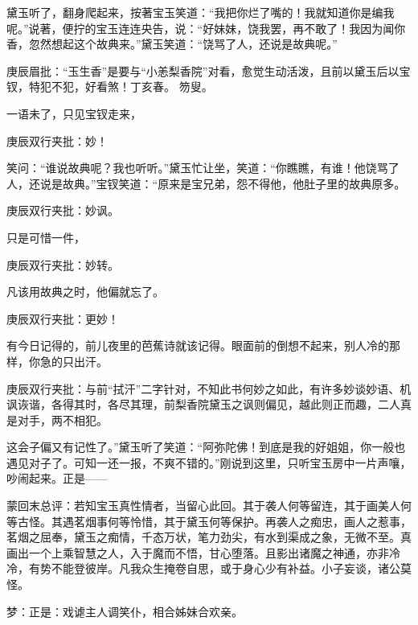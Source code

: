 \begin{parag}


    黛玉听了，翻身爬起来，按著宝玉笑道：“我把你烂了嘴的！我就知道你是编我呢。”说著，便拧的宝玉连连央告，说：“好妹妹，饶我罢，再不敢了！我因为闻你香，忽然想起这个故典来。”黛玉笑道：“饶骂了人，还说是故典呢。”\begin{note}庚辰眉批：“玉生香”是要与“小恙梨香院”对看，愈觉生动活泼，且前以黛玉后以宝钗，特犯不犯，好看煞！丁亥春。 笏叟。\end{note}
\end{parag}


\begin{parag}


    一语未了，只见宝钗走来，\begin{note}庚辰双行夹批：妙！\end{note}笑问：“谁说故典呢？我也听听。”黛玉忙让坐，笑道：“你瞧瞧，有谁！他饶骂了人，还说是故典。”宝钗笑道：“原来是宝兄弟，怨不得他，他肚子里的故典原多。\begin{note}庚辰双行夹批：妙讽。\end{note}只是可惜一件，\begin{note}庚辰双行夹批：妙转。\end{note}凡该用故典之时，他偏就忘了。\begin{note}庚辰双行夹批：更妙！\end{note}有今日记得的，前儿夜里的芭蕉诗就该记得。眼面前的倒想不起来，别人冷的那样，你急的只出汗。\begin{note}庚辰双行夹批：与前“拭汗”二字针对，不知此书何妙之如此，有许多妙谈妙语、机讽诙谐，各得其时，各尽其理，前梨香院黛玉之讽则偏见，越此则正而趣，二人真是对手，两不相犯。\end{note}这会子偏又有记性了。”黛玉听了笑道：“阿弥陀佛！到底是我的好姐姐，你一般也遇见对子了。可知一还一报，不爽不错的。”刚说到这里，只听宝玉房中一片声嚷，吵闹起来。正是——
\end{parag}

\begin{parag}

    \begin{note}蒙回末总评：若知宝玉真性情者，当留心此回。其于袭人何等留连，其于画美人何等古怪。其遇茗烟事何等怜惜，其于黛玉何等保护。再袭人之痴忠，画人之惹事，茗烟之屈奉，黛玉之痴情，千态万状，笔力劲尖，有水到渠成之象，无微不至。真画出一个上乘智慧之人，入于魔而不悟，甘心堕落。且影出诸魔之神通，亦非冷冷，有势不能登彼岸。凡我众生掩卷自思，或于身心少有补益。小子妄谈，诸公莫怪。\end{note}
\end{parag}


\begin{parag}


    \begin{note}梦：正是：戏谑主人调笑仆，相合姊妹合欢亲。\end{note}
\end{parag}
